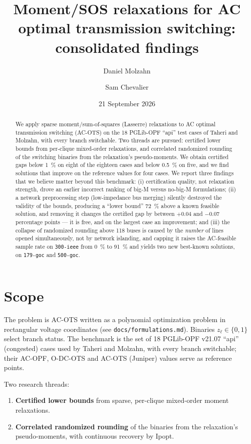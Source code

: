 \documentclass[11pt]{article}
\title{Moment/SOS relaxations for AC optimal transmission switching:\\consolidated findings}
\author{Daniel Molzahn \and Sam Chevalier}
\date{21 September 2026}
\newcommand{\code}[1]{\texttt{\small #1}}
\begin{document}
\maketitle

\begin{abstract}
We apply sparse moment/sum-of-squares (Lasserre) relaxations to AC optimal transmission switching
(AC-OTS) on the 18 PGLib-OPF ``api'' test cases of Taheri and Molzahn, with every branch switchable.
Two threads are pursued: certified lower bounds from per-clique mixed-order relaxations, and correlated
randomized rounding of the switching binaries from the relaxation's pseudo-moments. We obtain certified
gaps below \SI{1}{\percent} on eight of the eighteen cases and below \SI{0.5}{\percent} on five, and we
find solutions that improve on the reference values for four cases. We report three findings that we
believe matter beyond this benchmark: (i) certification quality, not relaxation strength, drove an
earlier incorrect ranking of big-M versus no-big-M formulations; (ii) a network preprocessing step
(low-impedance bus merging) silently destroyed the validity of the bounds, producing a ``lower bound''
\SI{72}{\percent} above a known feasible solution, and removing it changes the certified gap by
between $+0.04$ and $-0.07$ percentage points --- it is free, and on the largest case an improvement; and (iii) the collapse of randomized rounding above 118 buses is
caused by the \emph{number} of lines opened simultaneously, not by network islanding, and capping it
raises the AC-feasible sample rate on \code{300-ieee} from \SI{0}{\percent} to \SI{91}{\percent} and
yields two new best-known solutions, on \code{179-goc} and \code{500-goc}.
\end{abstract}

\section{Scope}

The problem is AC-OTS written as a polynomial optimization problem in rectangular voltage coordinates
(see \code{docs/formulations.md}). Binaries $z_\ell \in \{0,1\}$ select branch status. The benchmark is
the set of 18 PGLib-OPF v21.07 ``api'' (congested) cases used by Taheri and Molzahn, with every branch
switchable; their AC-OPF, O-DC-OTS and AC-OTS (Juniper) values serve as reference points.

Two research threads:
\begin{enumerate}
  \item \textbf{Certified lower bounds} from sparse, per-clique mixed-order moment relaxations.
  \item \textbf{Correlated randomized rounding} of the binaries from the relaxation's pseudo-moments,
        with continuous recovery by Ipopt.
\end{enumerate}
\end{document}
